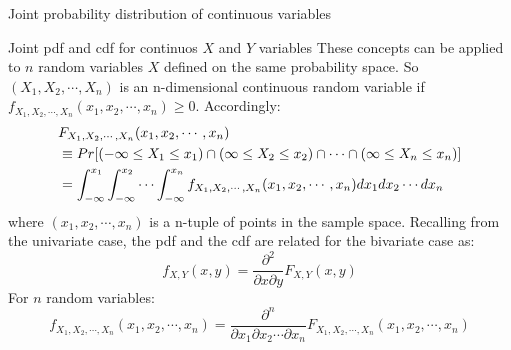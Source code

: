 \documentclass[8pt]{beamer}
\renewcommand{\emph}[1]{\textcolor{myorange}{#1}}
\begin{document}
\begin{frame}{Joint probability distribution of continuous variables}

    \begin{block}{Joint pdf and cdf for continuos $X$ and $Y$ variables}
        These concepts can be applied to $n$ random variables $X$ defined on the same probability space. So $(X_1, X_2, \cdots, X_n)$ is an \alert{n-dimensional continuous random variable } if $f_{X_1, X_2, \cdots, X_n} (x_1, x_2, \cdots, x_n) \geq 0$. Accordingly:
        \begin{align*}
            \displaystyle
            &F_{X_1, X_2, \cdots, X_n} (x_1, x_2, \cdots, x_n) \\
            &\equiv Pr[(-\infty \leq X_1 \leq x_1) \cap (\infty \leq X_2 \leq x_2) \cap \cdots \cap (\infty \leq X_n \leq x_n)] \\
            &= \int_{-\infty}^{x_1} \int_{-\infty}^{x_2} \cdots \int_{-\infty}^{x_n} f_{X_1, X_2, \cdots, X_n} (x_1, x_2, \cdots, x_n) dx_1 dx_2 \cdots dx_n
        \end{align*}
        where $(x_1, x_2, \cdots, x_n)$ is a \emph{n-tuple} of points in the sample space. 
        Recalling from the univariate case, the \emph{pdf} and the \emph{cdf} are related for the bivariate case as:
\[
            \displaystyle
            f_{X,Y} (x,y) = \frac{\partial^2 }{\partial x \partial y} F_{X,Y} (x,y)
        \]
        For $n$ random variables:
\[
            \displaystyle
             f_{X_1, X_2, \cdots, X_n} (x_1, x_2, \cdots, x_n) = \frac{\partial^n }{\partial x_1 \partial x_2  \cdots \partial x_n}F_{X_1, X_2, \cdots, X_n} (x_1, x_2, \cdots, x_n)
        \]

   \end{block}
\end{frame}
\end{document}
